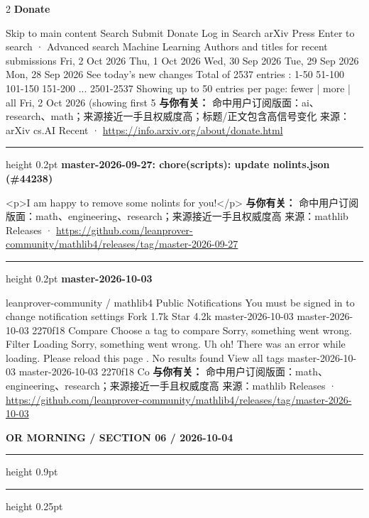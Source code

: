 \documentclass[10.5pt]{ctexart}
\begin{document}
\begin{multicols}{2}
{\large\bfseries Donate}\par
Skip to main content Search Submit Donate Log in Search arXiv Press Enter to search · Advanced search Machine Learning Authors and titles for recent submissions Fri, 2 Oct 2026 Thu, 1 Oct 2026 Wed, 30 Sep 2026 Tue, 29 Sep 2026 Mon, 28 Sep 2026 See today's new changes Total of 2537 entries : 1-50 51-100 101-150 151-200 ... 2501-2537 Showing up to 50 entries per page: fewer | more | all Fri, 2 Oct 2026 (showing first 5
\textbf{与你有关：} 命中用户订阅版面：ai、research、math；来源接近一手且权威度高；标题/正文包含高信号变化
{\footnotesize\color{ormuted} 来源：arXiv cs.AI Recent · \url{https://info.arxiv.org/about/donate.html}}
\vspace{2mm}
\hrule height 0.2pt
\vspace{2mm}
{\large\bfseries master-2026-09-27: chore(scripts): update nolints.json (\#44238)}\par
<p>I am happy to remove some nolints for you!</p>
\textbf{与你有关：} 命中用户订阅版面：math、engineering、research；来源接近一手且权威度高
{\footnotesize\color{ormuted} 来源：mathlib Releases · \url{https://github.com/leanprover-community/mathlib4/releases/tag/master-2026-09-27}}
\vspace{2mm}
\hrule height 0.2pt
\vspace{2mm}
{\large\bfseries master-2026-10-03}\par
leanprover-community / mathlib4 Public Notifications You must be signed in to change notification settings Fork 1.7k Star 4.2k master-2026-10-03 master-2026-10-03 2270f18 Compare Choose a tag to compare Sorry, something went wrong. Filter Loading Sorry, something went wrong. Uh oh! There was an error while loading. Please reload this page . No results found View all tags master-2026-10-03 master-2026-10-03 2270f18 Co
\textbf{与你有关：} 命中用户订阅版面：math、engineering、research；来源接近一手且权威度高
{\footnotesize\color{ormuted} 来源：mathlib Releases · \url{https://github.com/leanprover-community/mathlib4/releases/tag/master-2026-10-03}}
\end{multicols}
\newpage
{\small\bfseries OR MORNING / SECTION 06 / 2026-10-04}
\vspace{2mm}
\hrule height 0.9pt
\vspace{1.5mm}
\hrule height 0.25pt
\vspace{4mm}
\end{document}

